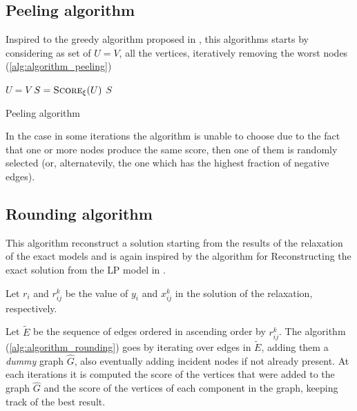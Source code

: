 \subsection{Peeling algorithm}%
\label{ssub:peeling_algorithm}

Inspired to the greedy algorithm proposed in \cite{charikar2000greedy}, this
algorithms starts by considering as set of $U = V$, all the vertices,
iteratively removing the worst nodes (\autoref{alg:algorithm_peeling})

\begin{algorithm}
	\SetAlgoLined
	$U = V$\;
	$S = \textsc{Score}_{\xi}(U)$ \;
	\Return $S$ \;

	\caption{Peeling algorithm}
	\label{alg:algorithm_peeling}
\end{algorithm}

In the case in some iterations the algorithm is unable to choose due to the
fact that one or more nodes produce the same score, then one of them is
randomly selected (or, alternatevily, the one which has the highest fraction of
negative edges).

\subsection{Rounding algorithm}%
\label{ssub:rounding_algorithm}

This algorithm reconstruct a solution starting from the results of the
relaxation of the exact models and is again inspired by the algorithm for
Reconstructing the exact solution from the \acrshort{LP} model in
\cite{charikar2000greedy}.

Let $r_{i}$ and $r_{ij} ^{k} $ be the value of $y_i$ and $x_{ij}^{k} $ in the
solution of the relaxation, respectively.

Let $\tilde{E}$ be the sequence of edges ordered in ascending order by $r_{ij}
		^{k} $. The algorithm (\autoref{alg:algorithm_rounding}) goes by iterating over
edges in $\tilde{E}$, adding them a \emph{dummy} graph $\hat{G}$, also eventually
adding incident nodes if not already present. At each iterations it is computed
the score of the vertices that were added to the graph $\hat{G}$ and the score
of the vertices of each component in the graph, keeping track of the best
result.

